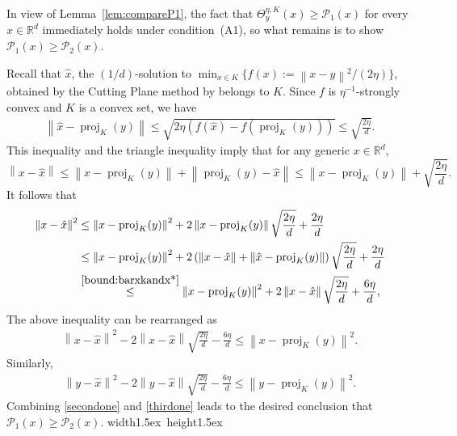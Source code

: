 \documentclass[11pt,letterpaper]{article}
\newcommand{\R}{\mathbb{R}}
\newcommand{\norm}[1]{\left\lVert #1 \right\rVert}
\newcommand{\proj}{\operatorname{proj}}
\newcommand{\brac}[1]{\left( #1\right)}
\newcommand*{\QEDA}{\hfill\hbox{\vrule width1.5ex height1.5ex}}
\begin{document}
    In view of Lemma~\ref{lem:compareP1}, the fact that $\Theta^{\eta,K}_y(x) \ge \mathcal{P}_1(x)$ for every $x\in \R^d$ immediately holds under condition~(A1), so what remains is to show $\mathcal{P}_1(x)\geq \mathcal{P}_2(x)$.

\noindent
Recall that $\hat{x}$, the $(1/d)$-solution to $\min_{x\in K}\{f(x):=\norm{x-y}^2/(2\eta)\}$, obtained by the Cutting Plane method by \cite{jiang2020cuttingplane} belongs to $K$. Since $f$ is $\eta^{-1}$-strongly convex and $K$ is a convex set, we have 
    \begin{align}
    \label{bound:barxkandx*}
        \norm{\hat{x}-\proj_K(y)}\leq \sqrt{2\eta \brac{f(\hat{x})-f(\proj_K(y))}}\leq \sqrt{\frac{2\eta}{d}}.  
    \end{align}
This inequality and the triangle inequality imply that for any generic $x\in \R^d$,
\begin{equation}
\label{consequence:triangle}
    \norm{x-\hat{x}}\leq \norm{x-\proj_K(y)}+\norm{\proj_K(y)-\hat{x}}\leq \norm{x-\proj_K(y)}+\sqrt{\frac{2\eta}{d}}. 
\end{equation}
It follows that 
\begin{align*}
    \norm{x-\hat{x}}^2
    &\leq \norm{x-\proj_K(y)}^2+2\norm{x-\proj_K(y)}\sqrt{\frac{2\eta}{d}}+\frac{2\eta}{d}\\
    &\leq \norm{x-\proj_K(y)}^2+2\brac{\norm{x-\hat{x}}+\norm{\hat{x}-\proj_K(y)} }\sqrt{\frac{2\eta}{d}}+\frac{2\eta}{d}\\
    &\stackrel{\eqref{bound:barxkandx*}}\leq \norm{x-\proj_K(y)}^2+2\norm{x-\hat{x}}\sqrt{\frac{2\eta}{d}}+\frac{6\eta}{d},
\end{align*}
The above inequality can be rearranged as 
\begin{align}
\label{secondone}
    \norm{x-\hat{x}}^2-2\norm{x-\hat{x}}\sqrt{\frac{2\eta}{d}}-\frac{6\eta}{d}\leq \norm{x-\proj_K(y)}^2.
\end{align}
Similarly, 
\begin{align}
    \label{thirdone}
    \norm{y-\hat{x}}^2-2\norm{y-\hat{x}}\sqrt{\frac{2\eta}{d}}-\frac{6\eta}{d}\leq \norm{y-\proj_K(y)}^2.
\end{align}
Combining \eqref{secondone} and \eqref{thirdone} leads to the desired conclusion that $\mathcal{P}_1(x)\geq \mathcal{P}_2(x)$. 
\QEDA
\end{document}
